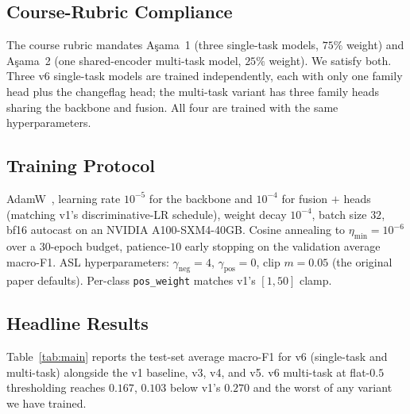 \documentclass[journal]{IEEEtran}
\begin{document}
\subsection{Course-Rubric Compliance}\label{ssec:rubric}
The course rubric mandates A\c{s}ama~1 (three single-task models, $75\%$ weight) and A\c{s}ama~2 (one shared-encoder multi-task model, $25\%$ weight). We satisfy both. Three v6 single-task models are trained independently, each with only one family head plus the changeflag head; the multi-task variant has three family heads sharing the backbone and fusion. All four are trained with the same hyperparameters.

\subsection{Training Protocol}\label{ssec:training}
AdamW~\cite{loshchilov2019adamw}, learning rate $10^{-5}$ for the backbone and $10^{-4}$ for fusion $+$ heads (matching v1's discriminative-LR schedule), weight decay $10^{-4}$, batch size $32$, bf16 autocast on an NVIDIA A100-SXM4-40GB. Cosine annealing to $\eta_\mathrm{min}{=}10^{-6}$ over a $30$-epoch budget, patience-$10$ early stopping on the validation average macro-F1. ASL hyperparameters: $\gamma_\mathrm{neg}{=}4$, $\gamma_\mathrm{pos}{=}0$, clip $m{=}0.05$ (the original paper defaults). Per-class \texttt{pos\_weight} matches v1's $[1, 50]$ clamp.

\subsection{Headline Results}\label{ssec:headline}

Table~\ref{tab:main} reports the test-set average macro-F1 for v6 (single-task and multi-task) alongside the v1 baseline, v3, v4, and v5. v6 multi-task at flat-$0.5$ thresholding reaches $0.167$, $0.103$ below v1's $0.270$ and the worst of any variant we have trained.
\end{document}
